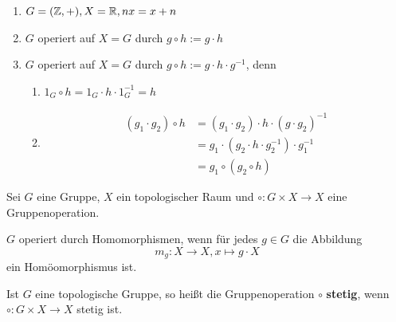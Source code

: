 \begin{beispiel}
    \begin{enumerate}[label=\arabic*),ref=\thebeispiel.\arabic*]
        \item $G = (\mathbb{Z}, +), X = \mathbb{R}, nx = x + n$\label{bsp:gruppenoperation1}
        \item $G$ operiert auf $X = G$ durch $g \circ h := g \cdot h$
        \item $G$ operiert auf $X = G$ durch $g \circ h := g \cdot h \cdot g^{-1}$, denn
        \begin{enumerate}[label=\roman*)]
            \item $1_G \circ h = 1_G \cdot h \cdot 1_G^{-1} = h$
            \item \begin{align*}
                    (g_1 \cdot g_2) \circ h &= (g_1 \cdot g_2) \cdot h \cdot (g \cdot g_2)^{-1}\\
                        &= g_1 \cdot (g_2 \cdot h \cdot g_2^{-1}) \cdot g_1^{-1}\\
                        &= g_1 \circ (g_2 \circ h)
                  \end{align*}
        \end{enumerate}
    \end{enumerate}
\end{beispiel}

\begin{definition}
    Sei $G$ eine Gruppe, $X$ ein topologischer Raum und
    $\circ: G \times X \rightarrow X$ eine Gruppenoperation.

    \begin{defenum}
        \item $G$ operiert durch Homomorphismen, wenn für jedes $g \in G$
              die Abbildung
              \[m_g: X \rightarrow X, x \mapsto g \cdot X\]
              ein Homöomorphismus ist.
        \item Ist $G$ eine topologische Gruppe, so heißt die Gruppenoperation $\circ$
              \textbf{stetig}, wenn 
              $\circ: G \times X \rightarrow X$ stetig ist.
    \end{defenum}
\end{definition}

